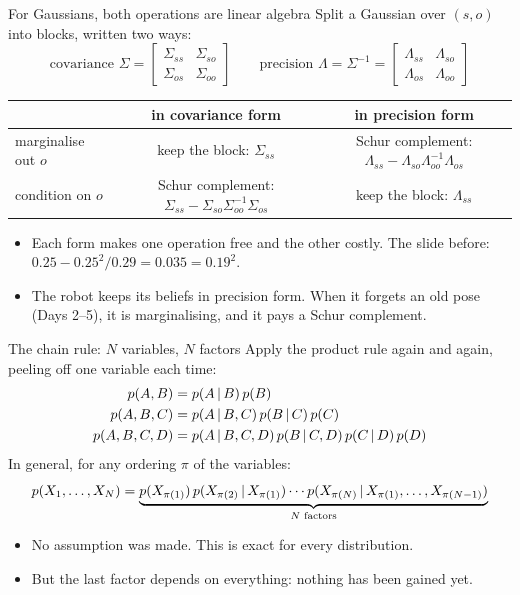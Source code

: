 \documentclass[10pt, aspectratio=169]{beamer}
\begin{document}
\begin{frame}{For Gaussians, both operations are linear algebra}
  Split a Gaussian over $(s, o)$ into blocks, written two ways:
  \[
    \text{covariance } \Sigma = \begin{bmatrix} \Sigma_{ss} & \Sigma_{so}\\ \Sigma_{os} & \Sigma_{oo} \end{bmatrix}
    \qquad
    \text{precision } \Lambda = \Sigma^{-1} = \begin{bmatrix} \Lambda_{ss} & \Lambda_{so}\\ \Lambda_{os} & \Lambda_{oo} \end{bmatrix}
  \]
  \begin{center}
  \renewcommand{\arraystretch}{1.4}
  \begin{tabular}{@{}l c c@{}}
    \toprule
                         & in covariance form & in precision form \\
    \midrule
    marginalise out $o$  & keep the block: $\Sigma_{ss}$ & Schur complement: $\Lambda_{ss} - \Lambda_{so}\Lambda_{oo}^{-1}\Lambda_{os}$ \\
    condition on $o$     & Schur complement: $\Sigma_{ss} - \Sigma_{so}\Sigma_{oo}^{-1}\Sigma_{os}$ & keep the block: $\Lambda_{ss}$ \\
    \bottomrule
  \end{tabular}
  \end{center}
  \begin{itemize}\small
    \item Each form makes one operation free and the other costly. The slide before:
          $0.25 - 0.25^2/0.29 = 0.035 = 0.19^2$.
    \item The robot keeps its beliefs in precision form. When it forgets an old pose (Days 2--5),
          it is marginalising, and it pays a Schur complement.
  \end{itemize}
\end{frame}

\begin{frame}{The chain rule: $N$ variables, $N$ factors}
  Apply the product rule again and again, peeling off one variable each time:
  \begin{align*}
    p(A, B)       &= p(A\,|\, B)\,p(B) \\
    p(A, B, C)    &= p(A\,|\, B, C)\,p(B\,|\, C)\,p(C) \\
    p(A, B, C, D) &= p(A\,|\, B, C, D)\,p(B\,|\, C, D)\,p(C\,|\, D)\,p(D)
  \end{align*}
  In general, for any ordering $\pi$ of the variables:
  \[
    p(X_1, \ldots, X_N) =
    \underbrace{p(X_{\pi(1)})\,p(X_{\pi(2)}\,|\, X_{\pi(1)})\cdots
                p(X_{\pi(N)}\,|\, X_{\pi(1)}, \ldots, X_{\pi(N-1)})}_{N\text{ factors}}
  \]
  \begin{itemize}\small
    \item No assumption was made. This is exact for every distribution.
    \item But the last factor depends on everything: nothing has been gained yet.
  \end{itemize}
\end{frame}
\end{document}
